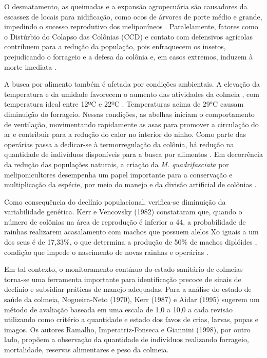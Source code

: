 \documentclass[12pt]{unisenaiclass}
\begin{document}
O desmatamento, as queimadas e a expansão agropecuária são causadores da escassez de locais para nidificação, como ocos de árvores de porte médio e grande, impedindo o sucesso reprodutivo dos meliponíneos \cite{rodriguesocos1964}. Paralelamente, fatores como o Distúrbio do Colapso das Colônias (CCD) e contato com defensivos agrícolas contribuem para a redução da população, pois enfraquecem os insetos, prejudicando o forrageio e a defesa da colônia e, em casos extremos, induzem à morte imediata \cite{tomemushroom2012,silvaagrotoxicos2014}. 

A busca por alimento também é afetada por condições ambientais. A elevação da temperatura e da umidade favorecem o aumento das atividades da colmeia \cite{barbosa2023}, com temperatura ideal entre 12ºC e 22ºC \cite{maiasilva2014}. Temperaturas acima de 29°C causam diminuição do forrageio. Nessas condições, as abelhas iniciam o comportamento de ventilação, movimentando rapidamente as asas para promover a circulação do ar e contribuir para a redução do calor no interior do ninho. Como parte das operárias passa a dedicar-se à termorregulação da colônia, há redução na quantidade de indivíduos disponíveis para a busca por alimentos \cite{hikawapollination2009}. Em decorrência da redução das populações naturais, a criação da \textit{M. quadrifasciata} por meliponicultores desempenha um papel importante para a conservação e multiplicação da espécie, por meio do manejo e da divisão artificial de colônias \cite{aidarartificial1998}.

Como consequência do declínio populacional, verifica-se diminuição da variabilidade genética. Kerr e Vencovsky (1982) constataram que, quando o número de colônias na área de reprodução é inferior a 44, a probabilidade de rainhas realizarem acasalamento com machos que possuem alelos Xo iguais a um dos seus é de 17,33\%, o que determina a produção de 50\% de machos diplóides \cite{mackensengenetica1951,kerrgenetica1987}, condição que impede o nascimento de novas rainhas e operárias \cite{camargoreproducao1976}.

Em tal contexto, o monitoramento contínuo do estado sanitário de colmeias torna-se uma ferramenta importante para identificação precoce de sinais de declínio e subsidiar práticas de manejo adequadas. Para a análise do estado de saúde da colmeia, Nogueira-Neto (1970), Kerr (1987) e Aidar (1995) sugerem um método de avaliação baseada em uma escala de 1,0 a 10,0 a cada revisão utilizando como critério a quantidade e estado dos favos de crias, larvas, pupas e imagos. Os autores Ramalho, Imperatriz-Fonseca e Giannini (1998), por outro lado, propõem a observação da quantidade de indivíduos realizando forrageio, mortalidade, reservas alimentares e peso da colmeia.
\end{document}
